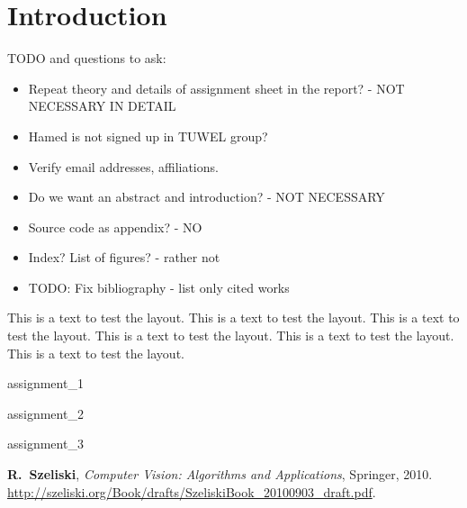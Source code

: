\documentclass[a4paper,psfig,subfigure,epsfig,fleqn,ausarbeitung,amssmb,float,caption,fontenc]{article}
\begin{document}
\section{Introduction}
\label{sec:introduction}


TODO and questions to ask:
\begin{itemize}[noitemsep]
\item Repeat theory and details of assignment sheet in the report? - NOT NECESSARY IN DETAIL
\item Hamed is not signed up in TUWEL group? 
\item Verify email addresses, affiliations.
\item Do we want an abstract and introduction? - NOT NECESSARY
\item Source code as appendix? - NO
\item Index? List of figures? - rather not
\item TODO: Fix bibliography - list only cited works
\end{itemize}


This is a text to test the layout. This is a text to test the layout.
This is a text to test the layout.  This is a text to test the layout.
This is a text to test the layout. This is a text to test the layout.

 {assignment_1}

 {assignment_2}

 {assignment_3}



\fontsize{9}{10pt}


\begin{thebibliography}{10}


{\bf R.~Szeliski},
\newblock \textit{Computer Vision: Algorithms and Applications},
\newblock Springer, 2010.
\newblock \url{http://szeliski.org/Book/drafts/SzeliskiBook_20100903_draft.pdf}.

\end{thebibliography}
\end{document}
